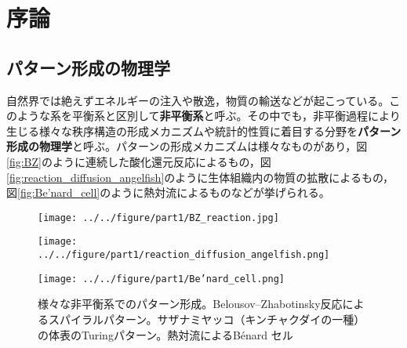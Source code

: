 \documentclass[autodetect-engine,dvi=dvipdfmx,a4paper,ja=standard,oneside,openany,11pt,draft]{bxjsbook}
\begin{document}
\chapter{序論}
\section{パターン形成の物理学}
自然界では絶えずエネルギーの注入や散逸，物質の輸送などが起こっている。このような系を平衡系と区別して\textbf{非平衡系}と呼ぶ。その中でも，非平衡過程により生じる様々な秩序構造の形成メカニズムや統計的性質に着目する分野を\textbf{パターン形成の物理学}と呼ぶ。パターンの形成メカニズムは様々なものがあり，図\ref{fig:BZ}のように連続した酸化還元反応によるもの，図\ref{fig:reaction_diffusion_angelfish}のように生体組織内の物質の拡散によるもの，図\ref{fig:Be’nard_cell}のように熱対流によるものなどが挙げられる。
\begin{figure}[htbp]
  \centering
  \begin{minipage}
    {0.32\textwidth}
    \subcaption{}
    \centering
    \texttt{[image: ../../figure/part1/BZ\_reaction.jpg]}
    \label{fig:BZ}
  \end{minipage}
  \begin{minipage}
    {0.32\textwidth}
    \subcaption{}
    \centering
    \texttt{[image: ../../figure/part1/reaction\_diffusion\_angelfish.png]}
    \label{fig:reaction_diffusion_angelfish}
  \end{minipage}
  \begin{minipage}
    {0.32\textwidth}
    \subcaption{}
    \centering
    \texttt{[image: ../../figure/part1/Be’nard\_cell.png]}
    \label{fig:Be’nard_cell}
  \end{minipage}
  \caption{様々な非平衡系でのパターン形成。Belousov–Zhabotinsky反応によるスパイラルパターン\cite{BZ_reaction}。サザナミヤッコ（キンチャクダイの一種）の体表のTuringパターン\cite{kondo1995reaction}。熱対流によるB{\'e}nard セル}
  \label{fig:pattern_formation}
\end{figure}
\end{document}
